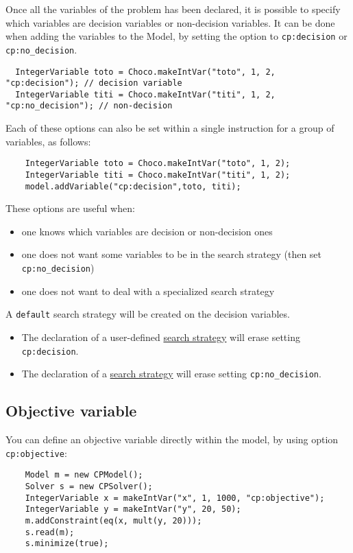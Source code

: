 Once all the variables of the problem has been declared, it is possible to specify which variables are decision variables or non-decision variables. It can be done when adding the variables to the Model, by setting the option to \texttt{cp:decision} or \texttt{cp:no\_decision}.
\begin{lstlisting}
  IntegerVariable toto = Choco.makeIntVar("toto", 1, 2, "cp:decision"); // decision variable
  IntegerVariable titi = Choco.makeIntVar("titi", 1, 2, "cp:no_decision"); // non-decision
\end{lstlisting}
Each of these options can also be set within a single instruction for a group of variables, as follows: 
\begin{lstlisting}
	IntegerVariable toto = Choco.makeIntVar("toto", 1, 2);
	IntegerVariable titi = Choco.makeIntVar("titi", 1, 2);
	model.addVariable("cp:decision",toto, titi);
\end{lstlisting}
These options are useful when:
\begin{itemize}
	\item one knows which variables are decision or non-decision ones
	\item one does not want some variables to be in the search strategy (then set \texttt{cp:no\_decision})
	\item one does not want to deal with a specialized search strategy
\end{itemize}
A \texttt{default} search strategy will be created on the decision variables. 
\begin{note}
  \begin{itemize}
  \item The declaration of a user-defined \hyperlink{solver:searchstrategy}{search strategy} will erase setting \texttt{cp:decision}.
  \item The declaration of a \hyperlink{solver:searchstrategy}{search strategy} will erase setting \texttt{cp:no\_decision}.
  \end{itemize}
\end{note}

\subsection{Objective variable}\label{model:objectivevariable}\hypertarget{model:objectivevariable}{}
You can define an objective variable directly within the model, by using option \texttt{cp:objective}:
\begin{lstlisting}
	Model m = new CPModel();
	Solver s = new CPSolver();
	IntegerVariable x = makeIntVar("x", 1, 1000, "cp:objective");
	IntegerVariable y = makeIntVar("y", 20, 50);
	m.addConstraint(eq(x, mult(y, 20)));
	s.read(m);
	s.minimize(true);
\end{lstlisting}

